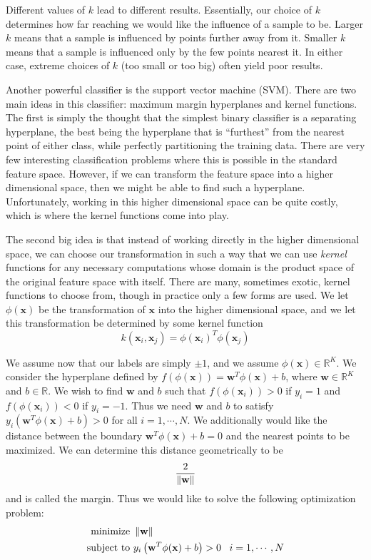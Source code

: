 Different values of $k$ lead to different results. 
Essentially, our choice of $k$ determines how far reaching we would like the influence of a sample to be. 
Larger $k$ means that a sample is influenced by points further away from it. 
Smaller $k$ means that a sample is influenced only by the few points nearest it. 
In either case, extreme choices of $k$ (too small or too big) often yield poor results.

Another powerful classifier is the support vector machine (SVM). 
There are two main ideas in this classifier: maximum margin hyperplanes and kernel functions. 
The first is simply the thought that the simplest binary classifier is a separating hyperplane, 
the best being the hyperplane that is ``furthest'' from the nearest point of either class, 
while perfectly partitioning the training data. 
There are very few interesting classification problems where this is possible in the standard feature space. 
However, if we can transform the feature space into a higher dimensional space, 
then we might be able to find such a hyperplane. Unfortunately, working in this higher dimensional space can be quite costly,
which is where the kernel functions come into play.

The second big idea is that instead of working directly in the higher dimensional space, 
we can choose our transformation in such a way that we can use \emph{kernel} functions for any 
necessary computations whose domain is the product space of the original feature space with itself. 
There are many, sometimes exotic, kernel functions to choose from, though in practice only a few forms are used. 
We let $\phi(\mathbf{x})$ be the transformation of $\mathbf{x}$ into the higher dimensional space, 
and we let this transformation be determined by some kernel function 
\begin{equation*}
k(\mathbf{x}_{i},\mathbf{x}_{j}) = \phi(\mathbf{x}_{i})^{T}\phi(\mathbf{x}_{j})
\end{equation*}

We assume now that our labels are simply $\pm 1$, and we assume $\phi(\mathbf{x}) \in \mathbb{R}^{K}$. 
We consider the hyperplane defined by $f(\phi(\mathbf{x})) = \mathbf{w}^{T}\phi(\mathbf{x}) + b$, 
where $\mathbf{w} \in \mathbb{R}^{K}$ and $b \in \mathbb{R}$. 
We wish to find $\mathbf{w}$ and $b$ such that 
$f(\phi(\mathbf{x}_{i})) > 0$ if $y_{i} = 1$ and 
$f(\phi(\mathbf{x}_{i})) < 0$ if $y_{i} = -1$. 
Thus we need $\mathbf{w}$ and $b$ to satisfy $y_{i}\left( \mathbf{w}^{T}\phi(\mathbf{x}) + b\right) > 0$ 
for all $i = 1, \cdots, N$. We additionally would like the distance between the boundary 
$\mathbf{w}^{T}\phi(\mathbf{x}) + b = 0$ and the nearest points to be maximized. 
We can determine this distance geometrically to be 
\begin{equation*}
\frac{2}{\left\lVert\mathbf{w}\right\rVert}
\end{equation*}
and is called the margin. Thus we would like to solve the following optimization problem:
\begin{align*}
\text{minimize } & \left\lVert\mathbf{w}\right\rVert \\
\text{subject to } & y_{i}\left(\mathbf{w}^{T}\phi(\mathbf{x}) + b\right) > 0 \; \; \; i = 1, \cdots, N
\end{align*} 

